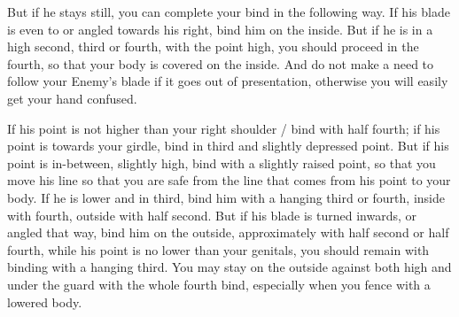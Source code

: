 \newpage


\newpage



But if he stays still, you can complete your bind in the following
way. If his blade is even to or angled towards his right, bind him on
the inside. But if he is in a high second, third or fourth, with the
point high, you should proceed in the fourth, so that your body is
covered on the inside. And do not make a need to follow your Enemy's
blade if it goes out of presentation, otherwise you will easily get
your hand confused.


If his point is not higher than your right shoulder / bind with half
fourth; if his point is towards your girdle, bind in third and
slightly depressed point. But if his point is in-between, slightly
high, bind with a slightly raised point, so that you move his line so
that you are safe from the line that comes from his point to your
body. If he is lower and in third, bind him with a hanging third or
fourth, inside with fourth, outside with half second. But if his blade
is turned inwards, or angled that way, bind him on the outside,
approximately with half second or half fourth, while his point is no
lower than your genitals, you should remain with binding with a
hanging third. You may stay on the outside against both high and under
the guard with the whole fourth bind, especially when you fence with a
lowered body.

